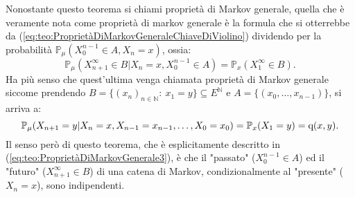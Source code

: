\documentclass[11pt]{book}
\theoremstyle{Definizione}
\theoremstyle{TeoremaProposizioneLemmaCorollario}
\theoremstyle{OsservazioneNota}
\newcommand{\N}{\mathbb{N}}
\renewcommand{\P}{\mathbb{P}}
\newcommand{\q}{\textup{q}}
\begin{document}
\noindent
Nonostante questo teorema si chiami proprietà di Markov generale, quella che è veramente nota come proprietà di markov generale è la formula che si otterrebbe da (\ref{eq:teo:ProprietàDiMarkovGeneraleChiaveDiViolino}) dividendo per la probabilità $\P_\mu(X_0^{n-1}\in A,X_n = x)$, ossia:
\begin{equation}\label{eq:ProprietàDiMarkovGeneraleVeraThisTime}
\P_\mu(X_{n+1}^\infty \in B| X_n = x, X_0^{n-1}\in A) = \P_x (X_1^\infty\in  B).
\end{equation}
Ha più senso che quest'ultima venga chiamata proprietà di Markov generale siccome prendendo $B =\{(x_n)_{n\in \N}:\ x_1 = y\}\subseteq E^{\N}$ e $A = \{(x_0,\dots,x_{n-1})\}$, si arriva a:
$$
\P_\mu(X_{n+1} = y| X_n = x, X_{n-1} = x_{n-1},\dots,X_0 = x_0) = \P_x(X_1 = y) = \q(x,y).
$$
Il senso però di questo teorema, che è esplicitamente descritto in (\ref{eq:teo:ProprietàDiMarkovGenerale3}), è che il "passato" ($X_{0}^{n-1}\in A$) ed il "futuro" ($X_{n+1}^\infty\in B$) di una catena di Markov, condizionalmente al "presente" ($X_n = x$), sono indipendenti.
\end{document}
